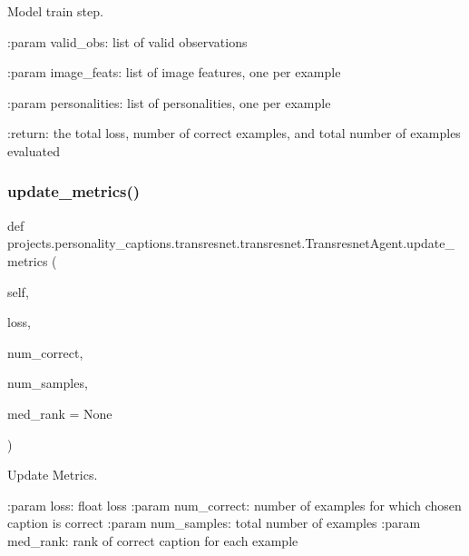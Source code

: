 \begin{DoxyVerb}Model train step.

:param valid_obs:
    list of valid observations

:param image_feats:
    list of image features, one per example

:param personalities:
    list of personalities, one per example

:return:
    the total loss, number of correct examples, and total number of
    examples evaluated
\end{DoxyVerb}
 \mbox{\label{classprojects_1_1personality__captions_1_1transresnet_1_1transresnet_1_1TransresnetAgent_a59ccc8175318115d066f550659de70d3}} 
\subsubsection{\texorpdfstring{update\+\_\+metrics()}{update\_metrics()}}
{\footnotesize\ttfamily def projects.\+personality\+\_\+captions.\+transresnet.\+transresnet.\+Transresnet\+Agent.\+update\+\_\+metrics (\begin{DoxyParamCaption}\item[{}]{self,  }\item[{}]{loss,  }\item[{}]{num\+\_\+correct,  }\item[{}]{num\+\_\+samples,  }\item[{}]{med\+\_\+rank = {\ttfamily None} }\end{DoxyParamCaption})}

\begin{DoxyVerb}Update Metrics.

:param loss:
    float loss
:param num_correct:
    number of examples for which chosen caption is correct
:param num_samples:
    total number of examples
:param med_rank:
    rank of correct caption for each example
\end{DoxyVerb}
 

